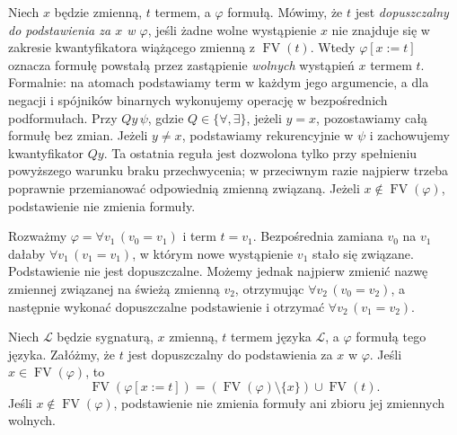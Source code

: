 \begin{definicja}\label{def:syntax-free-for}
Niech $x$ będzie zmienną, $t$ termem, a $\varphi$ formułą.
Mówimy, że $t$ jest \emph{dopuszczalny do podstawienia za $x$ w $\varphi$},
jeśli żadne wolne wystąpienie $x$ nie znajduje się w zakresie
kwantyfikatora wiążącego zmienną z $\operatorname{FV}(t)$.
Wtedy $\varphi[x:=t]$ oznacza formułę powstałą przez zastąpienie
\emph{wolnych} wystąpień $x$ termem $t$. Formalnie:
na atomach podstawiamy term w każdym jego argumencie,
a dla negacji i spójników binarnych wykonujemy operację
w bezpośrednich podformułach. Przy $Qy\,\psi$, gdzie
$Q\in\{\forall,\exists\}$, jeżeli $y=x$, pozostawiamy
całą formułę bez zmian. Jeżeli $y\ne x$, podstawiamy
rekurencyjnie w $\psi$ i zachowujemy kwantyfikator $Qy$.
Ta ostatnia reguła jest dozwolona tylko przy spełnieniu
powyższego warunku braku przechwycenia; w przeciwnym razie
najpierw trzeba poprawnie przemianować odpowiednią
zmienną związaną. Jeżeli $x\notin\operatorname{FV}(\varphi)$,
podstawienie nie zmienia formuły.
\end{definicja}
\begin{przyklad}
Rozważmy $\varphi=\forall v_1\,(v_0=v_1)$ i term $t=v_1$.
Bezpośrednia zamiana $v_0$ na $v_1$ dałaby
$\forall v_1\,(v_1=v_1)$, w którym nowe wystąpienie $v_1$
stało się związane. Podstawienie nie jest dopuszczalne.
Możemy jednak najpierw zmienić nazwę zmiennej związanej na świeżą
zmienną $v_2$, otrzymując $\forall v_2\,(v_0=v_2)$, a następnie
wykonać dopuszczalne podstawienie i otrzymać
$\forall v_2\,(v_1=v_2)$.
\end{przyklad}
\begin{lemat}\label{lem:syntax-fv-subst}
Niech $\mathcal L$ będzie sygnaturą, $x$ zmienną,
$t$ termem języka $\mathcal L$, a $\varphi$ formułą tego języka.
Załóżmy, że $t$ jest dopuszczalny do podstawienia za $x$ w $\varphi$.
Jeśli $x\in\operatorname{FV}(\varphi)$, to
\[
\operatorname{FV}(\varphi[x:=t])
=(\operatorname{FV}(\varphi)\setminus\{x\})
\cup\operatorname{FV}(t).
\]
Jeśli $x\notin\operatorname{FV}(\varphi)$, podstawienie nie zmienia
formuły ani zbioru jej zmiennych wolnych.
\end{lemat}
